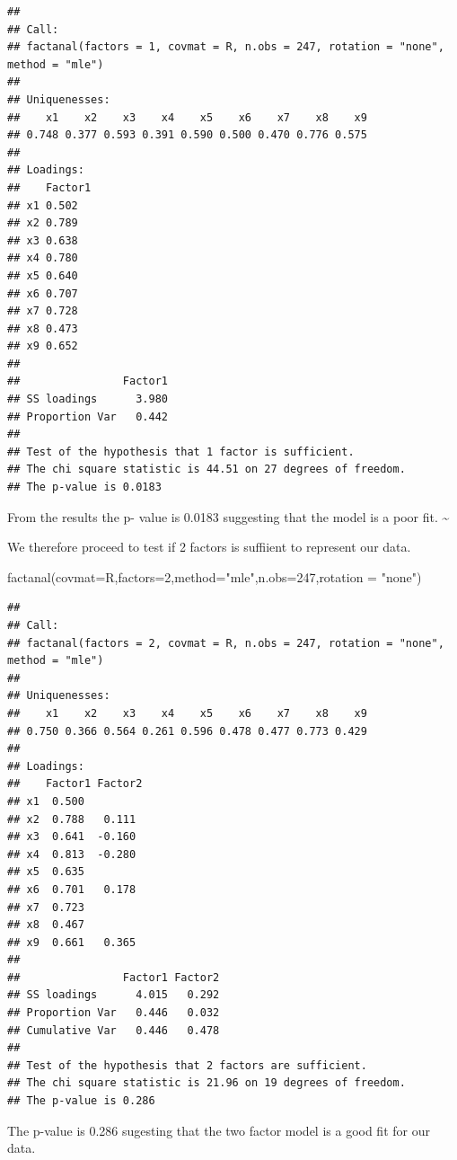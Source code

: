 \documentclass[
]{article}
\newenvironment{Shaded}{\begin{snugshade}}{\end{snugshade}}
\newcommand{\AttributeTok}[1]{\textcolor[rgb]{0.77,0.63,0.00}{#1}}
\newcommand{\DecValTok}[1]{\textcolor[rgb]{0.00,0.00,0.81}{#1}}
\newcommand{\FunctionTok}[1]{\textcolor[rgb]{0.00,0.00,0.00}{#1}}
\newcommand{\NormalTok}[1]{#1}
\newcommand{\StringTok}[1]{\textcolor[rgb]{0.31,0.60,0.02}{#1}}
\begin{document}
\begin{verbatim}
## 
## Call:
## factanal(factors = 1, covmat = R, n.obs = 247, rotation = "none",     method = "mle")
## 
## Uniquenesses:
##    x1    x2    x3    x4    x5    x6    x7    x8    x9 
## 0.748 0.377 0.593 0.391 0.590 0.500 0.470 0.776 0.575 
## 
## Loadings:
##    Factor1
## x1 0.502  
## x2 0.789  
## x3 0.638  
## x4 0.780  
## x5 0.640  
## x6 0.707  
## x7 0.728  
## x8 0.473  
## x9 0.652  
## 
##                Factor1
## SS loadings      3.980
## Proportion Var   0.442
## 
## Test of the hypothesis that 1 factor is sufficient.
## The chi square statistic is 44.51 on 27 degrees of freedom.
## The p-value is 0.0183
\end{verbatim}

From the results the p- value is 0.0183 suggesting that the model is a
poor fit. \textasciitilde{}

We therefore proceed to test if 2 factors is suffiient to represent our
data.

\begin{Shaded}
\begin{Highlighting}[]
\FunctionTok{factanal}\NormalTok{(}\AttributeTok{covmat=}\NormalTok{R,}\AttributeTok{factors=}\DecValTok{2}\NormalTok{,}\AttributeTok{method=}\StringTok{"mle"}\NormalTok{,}\AttributeTok{n.obs=}\DecValTok{247}\NormalTok{,}\AttributeTok{rotation =} \StringTok{"none"}\NormalTok{)}
\end{Highlighting}
\end{Shaded}

\begin{verbatim}
## 
## Call:
## factanal(factors = 2, covmat = R, n.obs = 247, rotation = "none",     method = "mle")
## 
## Uniquenesses:
##    x1    x2    x3    x4    x5    x6    x7    x8    x9 
## 0.750 0.366 0.564 0.261 0.596 0.478 0.477 0.773 0.429 
## 
## Loadings:
##    Factor1 Factor2
## x1  0.500         
## x2  0.788   0.111 
## x3  0.641  -0.160 
## x4  0.813  -0.280 
## x5  0.635         
## x6  0.701   0.178 
## x7  0.723         
## x8  0.467         
## x9  0.661   0.365 
## 
##                Factor1 Factor2
## SS loadings      4.015   0.292
## Proportion Var   0.446   0.032
## Cumulative Var   0.446   0.478
## 
## Test of the hypothesis that 2 factors are sufficient.
## The chi square statistic is 21.96 on 19 degrees of freedom.
## The p-value is 0.286
\end{verbatim}

The p-value is 0.286 sugesting that the two factor model is a good fit
for our data.
\end{document}
